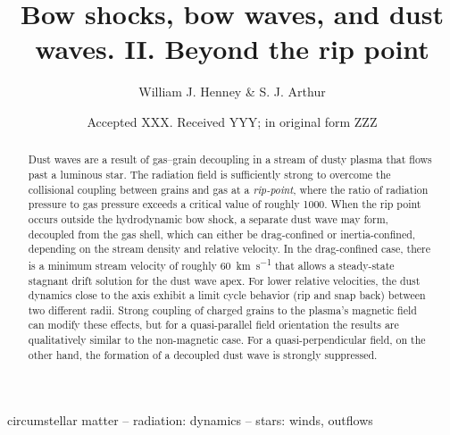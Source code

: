 \documentclass[useAMS, usenatbib, a4paper]{mnras}
\title
{Bow shocks, bow waves, and dust waves. II. Beyond the rip point}
\author[Henney \& Arthur]{
  William J. Henney \& S. J. Arthur\\
  \AddressCRyA
}
\date{Accepted XXX. Received YYY; in original form ZZZ}
\begin{document}
\label{firstpage}
\pagerange{\pageref{firstpage}--\pageref{lastpage}}
\maketitle
\begin{abstract}
  Dust waves are a result of gas--grain decoupling in a stream of
  dusty plasma that flows past a luminous star.  The radiation field
  is sufficiently strong to overcome the collisional coupling between
  grains and gas at a \textit{rip-point}, where the ratio of radiation
  pressure to gas pressure exceeds a critical value of roughly 1000.
  When the rip point occurs outside the hydrodynamic bow shock, a
  separate dust wave may form, decoupled from the gas shell, which can
  either be drag-confined or inertia-confined, depending on the stream
  density and relative velocity.  In the drag-confined case, there is
  a minimum stream velocity of roughly \SI{60}{km.s^{-1}} that allows
  a steady-state stagnant drift solution for the dust wave apex.  For
  lower relative velocities, the dust dynamics close to the axis
  exhibit a limit cycle behavior (rip and snap back) between two
  different radii.  Strong coupling of charged grains to the plasma's
  magnetic field can modify these effects, but for a quasi-parallel
  field orientation the results are qualitatively similar to the
  non-magnetic case. For a quasi-perpendicular field, on the other
  hand, the formation of a decoupled dust wave is strongly suppressed.
\end{abstract}

\begin{keywords}
  circumstellar matter -- radiation: dynamics -- stars: winds, outflows
\end{keywords}
\end{document}

